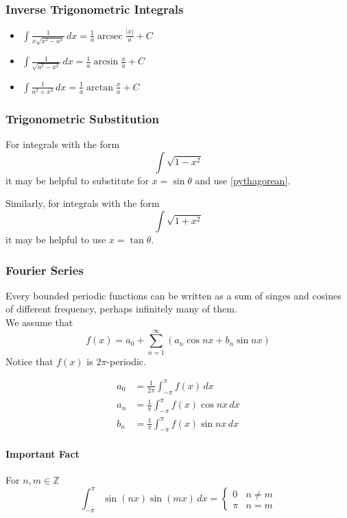 \documentclass{article}
\DeclareMathOperator{\arcsec}{arcsec}
\begin{document}
\subsubsection{Inverse Trigonometric Integrals}
\begin{itemize}
    \item $\int\frac{1}{x\sqrt{x^2-a^2}}\,dx=\frac{1}{a}\arcsec{\frac{|x|}{a}}+C$
    \item $\int\frac{1}{\sqrt{a^2-x^2}}\,dx=\frac{1}{a}\arcsin{\frac{x}{a}}+C$
    \item $\int\frac{1}{a^2+x^2}\,dx=\frac{1}{a}\arctan{\frac{x}{a}}+C$
\end{itemize}

\subsubsection{Trigonometric Substitution} \label{trig-sub}
For integrals with the form $$\int \sqrt{1-x^2}$$ it may be helpful to substitute for $x=\sin{\theta}$ and use \ref{pythagorean}.

Similarly, for integrals with the form $$\int \sqrt{1+x^2}$$ it may be helpful to use $x=\tan{\theta}$.
\subsubsection{Fourier Series}
Every bounded periodic functions can be written as a sum of singes and cosines of different frequency, perhaps infinitely many of them.\\
We assume that $$f(x)=a_0+\sum_{n=1}^{\infty}\left(a_n\cos{nx}+b_n\sin{nx}\right)$$
Notice that $f(x)$ is $2\pi$-periodic.

\begin{align*}
    a_0&=\frac{1}{2\pi}\int_{-\pi}^\pi f(x)\,dx\\
    a_n&=\frac{1}{\pi}\int_{-\pi}^\pi f(x)\cos{nx}\,dx\\
    b_n&=\frac{1}{\pi}\int_{-\pi}^\pi f(x)\sin{nx}\,dx
\end{align*}


\paragraph{Important Fact}
For $n,m\in\mathbb{Z}$
$$\int_{-\pi}^\pi \sin{\left(nx\right)}\sin{\left(mx\right)}\,dx=\begin{cases}
    0&n\ne m\\
    \pi&n=m
\end{cases}$$
\end{document}
